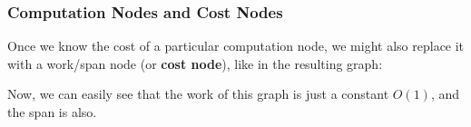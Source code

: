 \documentclass[aspectratio=169]{beamer}
\newcommand{\hex}[4][]{\node[hex, #1, minimum size=1cm] (#2) {$W$: #3 \\ $S$: #4}}
\begin{document}
\begin{frame}[fragile]
  \frametitle{Computation Nodes and Cost Nodes}

  \begin{center}
  \begin{minipage}{0.5\textwidth}
    \raggedright

    Once we know the cost of a particular computation node, we might also
    replace it with a work/span node (or \textbf{cost node}), like in the resulting graph:

    \vspace{10pt}

    Now, we can easily see that the work of this graph is just a constant $O(1)$,
    and the span is also.
  \end{minipage}
  \begin{minipage}{0.49\textwidth}
    \centering
  \end{minipage}
  \end{center}
\end{frame}
\end{document}
